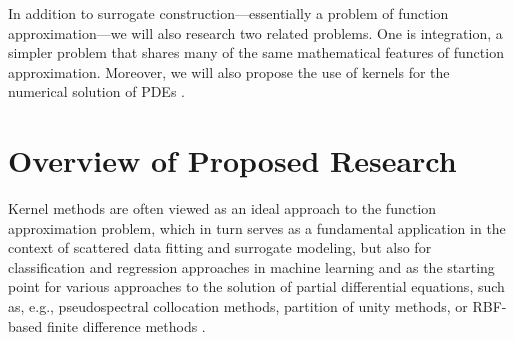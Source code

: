 \documentclass[11pt]{NSFamsart}
\begin{document}
In addition to surrogate construction---essentially a problem of function approximation---we will also research two related problems.  One is integration, a simpler problem that shares many of the same mathematical features of function approximation.  Moreover, we will also propose the use of kernels for the numerical solution of PDEs \citep{ChenEtAl14,FornbergFlyer15,SarraKansa09}.


\section{Overview of Proposed Research}
Kernel methods \citep{Fas07a,SchWen06a,Wen05a} are often viewed as an ideal approach to the function approximation problem, which in turn serves as a fundamental application in the context of scattered data fitting and surrogate modeling, but also for classification and regression approaches in machine learning \citep{HasTibFrie01} and as the starting point for various approaches to the solution of partial differential equations, such as, e.g., pseudospectral collocation methods, partition of unity methods, or RBF-based finite difference methods \citep{Fas07a,FornbergFlyer15}.
\end{document}
